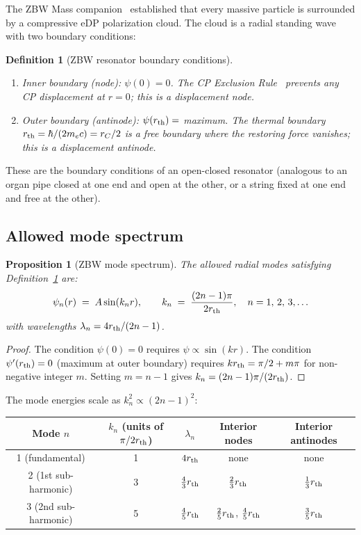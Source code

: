 \documentclass[12pt]{article}
\newtheorem{definition}[theorem]{Definition}
\newtheorem{proposition}[theorem]{Proposition}
\newcommand{\rC}{r_C}
\newcommand{\rth}{r_{\rm th}}
\begin{document}
The ZBW Mass companion~\cite{c4} established that every massive
particle is surrounded by a compressive eDP polarization cloud.
The cloud is a radial standing wave with two boundary conditions:

\begin{definition}[ZBW resonator boundary conditions]
\label{def:BC}
\quad
\begin{enumerate}[noitemsep]
  \item \emph{Inner boundary (node):} $\psi(0) = 0$.  The CP
    Exclusion Rule~\cite{c1} prevents any CP displacement at
    $r = 0$; this is a displacement node.
  \item \emph{Outer boundary (antinode):} $\psi(\rth) = $ maximum.
    The thermal boundary $\rth = \hbar/(2m_e c) = \rC/2$ is a
    free boundary where the restoring force vanishes; this is a
    displacement antinode.
\end{enumerate}
\end{definition}

These are the boundary conditions of an open-closed resonator
(analogous to an organ pipe closed at one end and open at the other,
or a string fixed at one end and free at the other).

\subsection{Allowed mode spectrum}

\begin{proposition}[ZBW mode spectrum]
\label{prop:modes}
The allowed radial modes satisfying Definition~\ref{def:BC} are:
\begin{equation}
  \psi_n(r) \;=\; A\sin(k_n r),
  \qquad
  k_n \;=\; \frac{(2n-1)\pi}{2\rth},
  \quad n = 1,\,2,\,3,\ldots
  \label{eq:modes}
\end{equation}
with wavelengths $\lambda_n = 4\rth/(2n-1)$.
\end{proposition}

\begin{proof}
The condition $\psi(0) = 0$ requires $\psi \propto \sin(kr)$.
The condition $\psi'(\rth) = 0$ (maximum at outer boundary) requires
$k\rth = \pi/2 + m\pi$ for non-negative integer $m$.  Setting
$m = n-1$ gives $k_n = (2n-1)\pi/(2\rth)$.
\end{proof}

The mode energies scale as $k_n^2 \propto (2n-1)^2$:
\begin{center}
\renewcommand{\arraystretch}{1.3}
\begin{tabular}{@{}ccccc@{}}
\toprule
Mode $n$ & $k_n$ (units of $\pi/2\rth$) & $\lambda_n$ &
Interior nodes & Interior antinodes \\
\midrule
1 (fundamental)   & 1 & $4\rth$         & none            & none \\
2 (1st sub-harmonic) & 3 & $\tfrac{4}{3}\rth$ & $\tfrac{2}{3}\rth$ & $\tfrac{1}{3}\rth$ \\
3 (2nd sub-harmonic) & 5 & $\tfrac{4}{5}\rth$ & $\tfrac{2}{5}\rth$, $\tfrac{4}{5}\rth$ & $\tfrac{3}{5}\rth$ \\
\bottomrule
\end{tabular}
\end{center}
\end{document}
